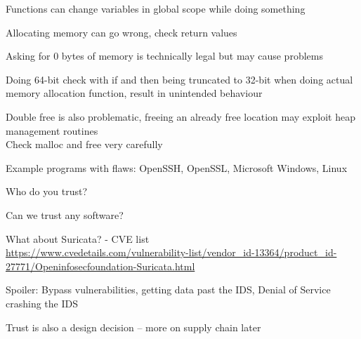\documentclass[Screen16to9,17pt]{foils}
\begin{document}

\begin{list2}
\item Functions can change variables in global scope while doing something
\item Allocating memory can go wrong, check return values
\item Asking for 0 bytes of memory is technically legal but may cause problems
\item Doing 64-bit check with if and then being truncated to 32-bit when doing actual memory allocation function, result in unintended behaviour
\item Double free is also problematic, freeing an already free location may exploit heap management routines\\
Check malloc and free very carefully
\end{list2}



\begin{list2}
\item Example programs with flaws: OpenSSH, OpenSSL, Microsoft Windows, Linux
\item Who do you trust?
\item Can we trust any software?

\item What about Suricata? - CVE list\\
{\footnotesize\url{https://www.cvedetails.com/vulnerability-list/vendor_id-13364/product_id-27771/Openinfosecfoundation-Suricata.html}}
\item Spoiler: Bypass vulnerabilities, getting data past the IDS, Denial of Service crashing the IDS
\item Trust is also a design decision -- more on supply chain later
\end{list2}

\end{document}
